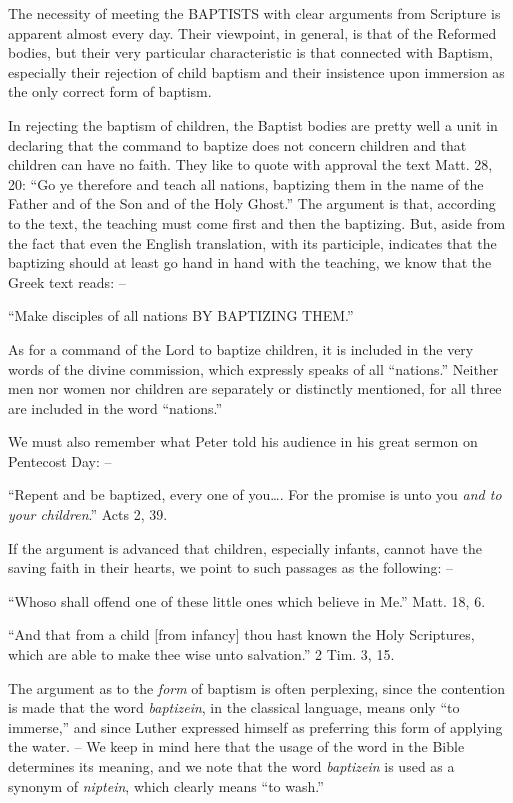 \documentclass[
]{book}
\begin{document}
The necessity of meeting the BAPTISTS with clear arguments from Scripture is apparent almost every day. Their viewpoint, in general, is that of the Reformed bodies, but their very particular characteristic is that connected with Baptism, especially their rejection of child baptism and their insistence upon immersion as the only correct form of baptism.

In rejecting the baptism of children, the Baptist bodies are pretty well a unit in declaring that the command to baptize does not concern children and that children can have no faith. They like to quote with approval the text Matt. 28, 20: ``Go ye therefore and teach all nations, baptizing them in the name of the Father and of the Son and of the Holy Ghost.'' The argument is that, according to the text, the teaching must come first and then the baptizing. But, aside from the fact that even the English translation, with its participle, indicates that the baptizing should at least go hand in hand with the teaching, we know that the Greek text reads: --

``Make disciples of all nations BY BAPTIZING THEM.''

As for a command of the Lord to baptize children, it is included in the very words of the divine commission, which expressly speaks of all ``nations.'' Neither men nor women nor children are separately or distinctly mentioned, for all three are included in the word ``nations.''

We must also remember what Peter told his audience in his great sermon on Pentecost Day: --

``Repent and be baptized, every one of you\ldots. For the promise is unto you \emph{and to your children}.'' Acts 2, 39.

If the argument is advanced that children, especially infants, cannot have the saving faith in their hearts, we point to such passages as the following: --

``Whoso shall offend one of these little ones which believe in Me.'' Matt. 18, 6.

``And that from a child {[}from infancy{]} thou hast known the Holy Scriptures, which are able to make thee wise unto salvation.'' 2 Tim. 3, 15.

The argument as to the \emph{form} of baptism is often perplexing, since the contention is made that the word \emph{baptizein}, in the classical language, means only ``to immerse,'' and since Luther expressed himself as preferring this form of applying the water. -- We keep in mind here that the usage of the word in the Bible determines its meaning, and we note that the word \emph{baptizein} is used as a synonym of \emph{niptein}, which clearly means ``to wash.''
\end{document}
